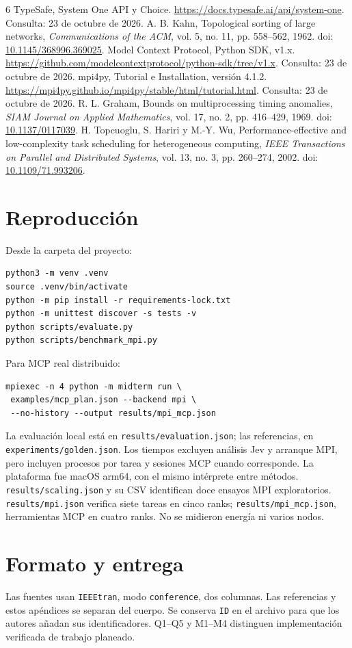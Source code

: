 \clearpage
{}
\begin{thebibliography}{6}
 TypeSafe, System One API y Choice.
\url{https://docs.typesafe.ai/api/system-one}.
Consulta: 23 de octubre de 2026.
 A. B. Kahn, Topological sorting of large networks,
\emph{Communications of the ACM}, vol. 5, no. 11, pp. 558--562, 1962.
doi: \href{https://doi.org/10.1145/368996.369025}{10.1145/368996.369025}.
 Model Context Protocol, Python SDK, v1.x.
\url{https://github.com/modelcontextprotocol/python-sdk/tree/v1.x}.
Consulta: 23 de octubre de 2026.
 mpi4py, Tutorial e Installation, versión 4.1.2.
\url{https://mpi4py.github.io/mpi4py/stable/html/tutorial.html}.
Consulta: 23 de octubre de 2026.
 R. L. Graham, Bounds on multiprocessing timing
anomalies, \emph{SIAM Journal on Applied Mathematics}, vol. 17,
no. 2, pp. 416--429, 1969.
doi: \href{https://doi.org/10.1137/0117039}{10.1137/0117039}.
 H. Topcuoglu, S. Hariri y M.-Y. Wu,
Performance-effective and low-complexity task scheduling for
heterogeneous computing, \emph{IEEE Transactions on Parallel and
Distributed Systems}, vol. 13, no. 3, pp. 260--274, 2002.
doi: \href{https://doi.org/10.1109/71.993206}{10.1109/71.993206}.
\end{thebibliography}

\appendices
\section{Reproducción}
Desde la carpeta del proyecto:
\begin{verbatim}
python3 -m venv .venv
source .venv/bin/activate
python -m pip install -r requirements-lock.txt
python -m unittest discover -s tests -v
python scripts/evaluate.py
python scripts/benchmark_mpi.py
\end{verbatim}
\newpage
Para MCP real distribuido:
\begin{verbatim}
mpiexec -n 4 python -m midterm run \
 examples/mcp_plan.json --backend mpi \
 --no-history --output results/mpi_mcp.json
\end{verbatim}
La evaluación local está en \texttt{results/evaluation.json}; las
referencias, en \texttt{experiments/golden.json}. Los tiempos excluyen
análisis Jev y arranque MPI, pero incluyen procesos por tarea y sesiones
MCP cuando corresponde. La plataforma fue macOS arm64, con el mismo
intérprete entre métodos.
\texttt{results/scaling.json} y su CSV identifican doce ensayos MPI
exploratorios. \texttt{results/mpi.json} verifica siete tareas en cinco
ranks; \texttt{results/mpi\_mcp.json}, herramientas MCP en cuatro ranks.
No se midieron energía ni varios nodos.

\section{Formato y entrega}
Las fuentes usan \texttt{IEEEtran}, modo \texttt{conference}, dos
columnas. Las referencias y estos apéndices se separan del cuerpo.
Se conserva \texttt{ID} en el archivo para que los autores añadan
sus identificadores. Q1--Q5 y M1--M4 distinguen implementación
verificada de trabajo planeado.
